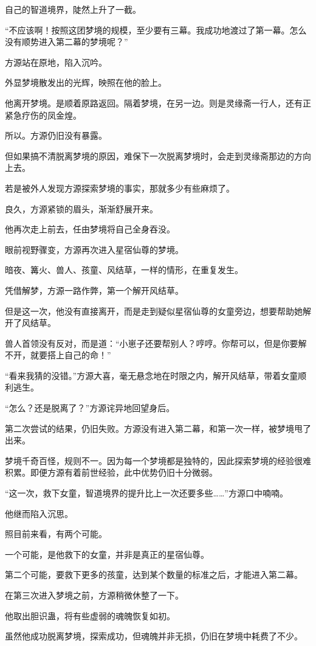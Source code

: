 \begin{this_body}
自己的智道境界，陡然上升了一截。

“不应该啊！按照这团梦境的规模，至少要有三幕。我成功地渡过了第一幕。怎么没有顺势进入第二幕的梦境呢？”

方源站在原地，陷入沉吟。

外显梦境散发出的光辉，映照在他的脸上。

他离开梦境。是顺着原路返回。隔着梦境，在另一边。则是灵缘斋一行人，还有正紧急疗伤的凤金煌。

所以。方源仍旧没有暴露。

但如果搞不清脱离梦境的原因，难保下一次脱离梦境时，会走到灵缘斋那边的方向上去。

若是被外人发现方源探索梦境的事实，那就多少有些麻烦了。

良久，方源紧锁的眉头，渐渐舒展开来。

他再次走上前去，任由梦境将自己全身吞没。

眼前视野骤变，方源再次进入星宿仙尊的梦境。

暗夜、篝火、兽人、孩童、风结草，一样的情形，在重复发生。

凭借解梦，方源一路作弊，第一个解开风结草。

但是这一次，他没有直接离开，而是走到疑似星宿仙尊的女童旁边，想要帮助她解开了风结草。

兽人首领没有反对，而是道：“小崽子还要帮别人？哼哼。你帮可以，但是你要解不开，就要搭上自己的命！”

“看来我猜的没错。”方源大喜，毫无悬念地在时限之内，解开风结草，带着女童顺利逃生。

“怎么？还是脱离了？”方源诧异地回望身后。

第二次尝试的结果，仍旧失败。方源没有进入第二幕，和第一次一样，被梦境甩了出来。

梦境千奇百怪，规则不一。因为每一个梦境都是独特的，因此探索梦境的经验很难积累。即便方源有着前世经验，此中优势仍旧十分微弱。

“这一次，救下女童，智道境界的提升比上一次还要多些……”方源口中喃喃。

他继而陷入沉思。

照目前来看，有两个可能。

一个可能，是他救下的女童，并非是真正的星宿仙尊。

第二个可能，要救下更多的孩童，达到某个数量的标准之后，才能进入第二幕。

在第三次进入梦境之前，方源稍微休整了一下。

他取出胆识蛊，将有些虚弱的魂魄恢复如初。

虽然他成功脱离梦境，探索成功，但魂魄并非无损，仍旧在梦境中耗费了不少。


\end{this_body}
